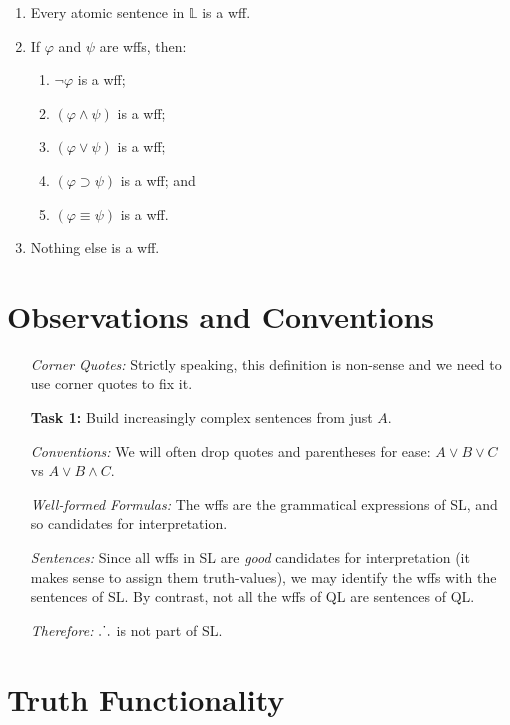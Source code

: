 \documentclass[a4paper, 11pt]{article} %
\def\therefore{\ensuremath{\ldotp\dot{}\,\ldotp}}
\begin{document}
\begin{enumerate}[leftmargin=1.5in,labelsep=.15in] %
  \item Every atomic sentence in $\mathbb{L}$ is a wff.
  \item If $\varphi$ and $\psi$ are wffs, then:
    \begin{enumerate}
      \item $\neg\varphi$ is a wff;
      \item $(\varphi\wedge\psi)$ is a wff;
      \item $(\varphi\vee\psi)$ is a wff;
      \item $(\varphi\supset\psi)$ is a wff; and
      \item $(\varphi\equiv\psi)$ is a wff.
    \end{enumerate}
  \item Nothing else is a wff.
\end{enumerate}




\section*{Observations and Conventions}

\begin{enumerate}[leftmargin=1.5in,labelsep=.15in] %
  \item[\it Corner Quotes:] Strictly speaking, this definition is non-sense and we need to use corner quotes to fix it.
  \item[\bf Task 1:] Build increasingly complex sentences from just $A$.
  \item[\it Conventions:] We will often drop quotes and parentheses for ease: $A\vee B\vee C$ vs $A\vee B\wedge C$.
  \item[\it Well-formed Formulas:] The wffs are the grammatical expressions of SL, and so candidates for interpretation.
  \item[\it Sentences:] Since all wffs in SL are \textit{good} candidates for interpretation (it makes sense to assign them truth-values), we may identify the wffs with the sentences of SL. By contrast, not all the wffs of QL are sentences of QL.
  \item[\it Therefore:] $\therefore$ is not part of SL.
\end{enumerate}






\section*{Truth Functionality}
\end{document}

